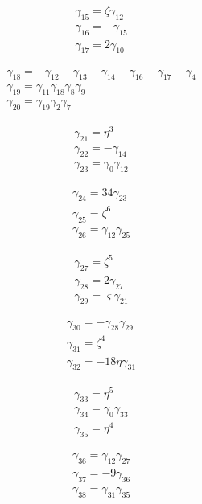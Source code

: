 \[\begin{aligned}\gamma_{15}=\zeta  \gamma_{12}\\ \gamma_{16}=- \gamma_{15}\\ \gamma_{17}=2 \gamma_{10}\end{aligned}\]

\[\begin{aligned}\gamma_{18}=- \gamma_{12} - \gamma_{13} - \gamma_{14} - \gamma_{16} - \gamma_{17} - \gamma_{4}\\ \gamma_{19}=\gamma_{11} \gamma_{18} \gamma_{8} \gamma_{9}\\ \gamma_{20}=\gamma_{19} \gamma_{2} \gamma_{7}\end{aligned}\]

\[\begin{aligned}\gamma_{21}=\eta ^{3}\\ \gamma_{22}=- \gamma_{14}\\ \gamma_{23}=\gamma_{0} \gamma_{12}\end{aligned}\]

\[\begin{aligned}\gamma_{24}=34 \gamma_{23}\\ \gamma_{25}=\zeta ^{6}\\ \gamma_{26}=\gamma_{12} \gamma_{25}\end{aligned}\]

\[\begin{aligned}\gamma_{27}=\zeta ^{5}\\ \gamma_{28}=2 \gamma_{27}\\ \gamma_{29}=\varsigma  \gamma_{21}\end{aligned}\]

\[\begin{aligned}\gamma_{30}=- \gamma_{28} \gamma_{29}\\ \gamma_{31}=\zeta ^{4}\\ \gamma_{32}=- 18 \eta  \gamma_{31}\end{aligned}\]

\[\begin{aligned}\gamma_{33}=\eta ^{5}\\ \gamma_{34}=\gamma_{0} \gamma_{33}\\ \gamma_{35}=\eta ^{4}\end{aligned}\]

\[\begin{aligned}\gamma_{36}=\gamma_{12} \gamma_{27}\\ \gamma_{37}=- 9 \gamma_{36}\\ \gamma_{38}=\gamma_{31} \gamma_{35}\end{aligned}\]


